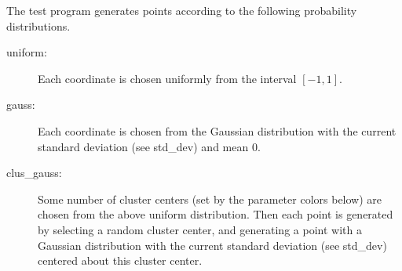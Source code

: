 \documentclass[11pt]{article}		%
\begin{document}
The test program generates points according to the following probability
distributions.
\begin{description}
\item[\hbox{\sf uniform:}] Each coordinate is chosen uniformly from the interval
	$[-1,1]$.
\item[\hbox{\sf gauss:}] Each coordinate is chosen from the Gaussian distribution
	with the current standard deviation (see \textsf{std\_dev}) and
	mean 0.
\item[\hbox{\sf clus\_gauss:}]
        Some number of cluster centers (set by the parameter \textsf{colors}
	below) are chosen from the above uniform distribution.  Then
	each point is generated by selecting a random cluster center, and
	generating a point with a Gaussian distribution with the current
	standard deviation (see \textsf{std\_dev}) centered about this cluster
	center.


\end{description}
\end{document}
